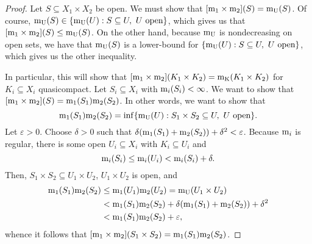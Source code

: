 \begin{thm}
\begin{proof}
Let $S\subseteq X_1\times X_2$ be open.  We must show that $[\mathrm{m} _1\times \mathrm{m} _2](S)=\mathrm{m} _{\mathrm{U}}(S)$.  Of course, $\mathrm{m} _{\mathrm{U}}(S)\in \{ \mathrm{m} _{\mathrm{U}}(U):S\subseteq U,\ U\text{ open}\}$, which gives us that $[\mathrm{m} _1\times \mathrm{m} _2](S)\leq \mathrm{m} _{\mathrm{U}}(S)$.  On the other hand, because $\mathrm{m} _{\mathrm{U}}$ is nondecreasing on open sets, we have that $\mathrm{m} _{\mathrm{U}}(S)$ is a lower-bound for $\{ \mathrm{m} _{\mathrm{U}}(U):S\subseteq U,\ U\text{ open}\}$, which gives us the other inequality.

\label{stpProductMeasure.5}
In particular, this will show that $[\mathrm{m} _1\times \mathrm{m} _2](K_1\times K_2)=\mathrm{m} _{\mathrm{K}}(K_1\times K_2)$ for $K_i\subseteq X_i$ quasicompact.  Let $S_i\subseteq X_i$ with $\mathrm{m} _i(S_i)<\infty$.  We want to show that $[\mathrm{m} _1\times \mathrm{m} _2](S)=\mathrm{m} _1(S_1)\mathrm{m} _2(S_2)$.  In other words, we want to show that
\begin{equation}
\mathrm{m} _1(S_1)\mathrm{m} _2(S_2)=\inf \{ \mathrm{m} _{\mathrm{U}}(U):S_1\times S_2\subseteq U,\ U\text{ open}\} .
\end{equation}
Let $\varepsilon >0$.  Choose $\delta >0$ such that $\delta (\mathrm{m} _1(S_1)+\mathrm{m} _2(S_2))+\delta ^2<\varepsilon$.  Because $\mathrm{m} _i$ is regular, there is some open $U_i\subseteq X_i$ with $K_i\subseteq U_i$ and
\begin{equation}
\mathrm{m} _i(S_i)\leq \mathrm{m} _i(U_i)<\mathrm{m} _i(S_i)+\delta .
\end{equation}
Then, $S_1\times S_2\subseteq U_1\times U_2$, $U_1\times U_2$ is open, and
\begin{equation}
\begin{split}
\mathrm{m} _1(S_1)\mathrm{m} _2(S_2) & \leq \mathrm{m} _1(U_1)\mathrm{m} _2(U_2)=\mathrm{m} _{\mathrm{U}}(U_1\times U_2) \\
& <\mathrm{m} _1(S_1)\mathrm{m} _2(S_2)+\delta (\mathrm{m} _1(S_1)+\mathrm{m} _2(S_2))+\delta ^2 \\
& <\mathrm{m} _1(S_1)\mathrm{m} _2(S_2)+\varepsilon ,
\end{split}
\end{equation}
whence it follows that $[\mathrm{m} _1\times \mathrm{m} _2](S_1\times S_2)=\mathrm{m} _1(S_1)\mathrm{m} _2(S_2)$.


\end{proof}
\end{thm}
